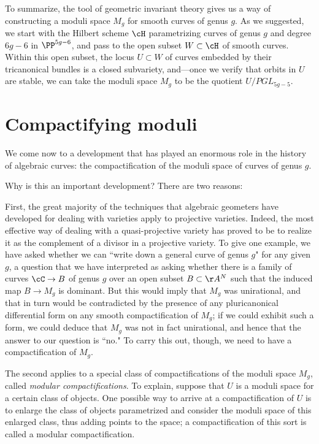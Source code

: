 To summarize, the tool of geometric invariant theory gives us a way of constructing a moduli space $M_g$ for smooth  curves of genus $g$. As we suggested, we start with the Hilbert scheme $\cH$ parametrizing curves of genus $g$ and degree $6g-6$ in $\PP^{5g-6}$, and pass to the open subset $W \subset \cH$ of smooth curves. Within this open subset, the locus $U \subset W$ of curves embedded by their tricanonical bundles is a closed subvariety, and---once we verify that orbits in $U$ are stable, we can take the moduli space $M_g$ to be the quotient $U/PGL_{5g-5}$.

\section{Compactifying moduli}

We come now to a development that has played an enormous role in the history of algebraic curves: the compactification of the moduli space of curves of genus $g$.

Why is this an important development? There are two reasons:

First, the great majority of the techniques that algebraic geometers have developed for dealing with varieties apply to projective varieties. Indeed, the most effective way of dealing with a quasi-projective variety has proved to be to realize it as the complement of a divisor in a projective variety. To give one example, we have asked whether we can ``write down a general curve of genus $g$" for any given $g$, a question that we have interpreted as asking whether there is a family of curves $\cC \to B$ of genus $g$ over an open subset $B \subset \AA^N$ such that the induced map $B \to M_g$ is dominant. But this would imply that $M_g$ was unirational, and that in turn would be contradicted by the presence of any pluricanonical differential form on any smooth compactification of $M_g$; if we could exhibit such a form, we could deduce that $M_g$ was not in fact unirational, and hence that the answer to our question is ``no." To carry this out, though, we need to have a compactification of $M_g$.

The second applies to a special class of compactifications of the moduli space $M_g$, called \emph{modular compactifications}. To explain, suppose that $U$ is a moduli space for a certain class of objects. One possible way to arrive at a compactification of $U$ is to enlarge the class of objects parametrized and consider the moduli space of this enlarged class, thus adding points to the space; a compactification of this sort  is called a modular compactification.

